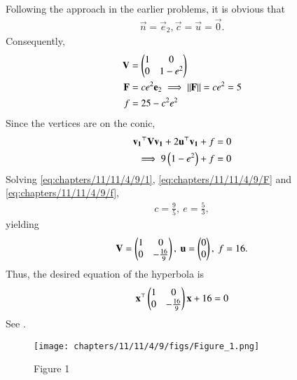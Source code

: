 Following the approach in the earlier problems, it is obvious that
	\begin{align}
		\vec{n} 
			= \vec{e}_2,
	\vec{c} =\vec{u}=\vec{0}.
\end{align}
Consequently,
%
\begin{align}
	\mathbf{V} &= \begin{pmatrix}1 &0\\ 0 & 1-e^2\end{pmatrix}
	\\
	\mathbf{F} &= ce^2\mathbf{e}_2 \implies \left\lVert\mathbf{F}\right\rVert = ce^2=5
\label{eq:chapters/11/11/4/9/F}
	\\
	f 
	  &= 25 - c^2 e^2
\label{eq:chapters/11/11/4/9/f}
\end{align}
%
Since the vertices are  on the conic,
\begin{align}
	\mathbf{v_1}^{\top}\mathbf{V}\mathbf{v_1} +2\mathbf{u}^{\top}\mathbf{v_1}+f &= 0\\
\implies 9\left(1-e^2\right) + f &= 0\\
 \label{eq:chapters/11/11/4/9/1}
\end{align}
Solving \eqref{eq:chapters/11/11/4/9/1},
\eqref{eq:chapters/11/11/4/9/F}
and
\eqref{eq:chapters/11/11/4/9/f},
\begin{align}
	c = \frac{9}{5},\ 
	e = \frac{5}{3},
\end{align}
%
yielding
\begin{align}
	\mathbf{V} = \begin{pmatrix}1&0\\0& -\frac{16}{9}\end{pmatrix} ,\
	\mathbf{u} = \begin{pmatrix}0\\0\end{pmatrix},\
	f = 16.
\end{align}
%
Thus, the desired equation of the hyperbola is
\begin{align}
	\mathbf{x}^{\top} \begin{pmatrix}1&0\\ 0 & -\frac{16}{9}\end{pmatrix} \mathbf{x} +16 =0
\end{align}
%
See
%
    .
\begin{figure}[H]
  \centering
    \texttt{[image: chapters/11/11/4/9/figs/Figure\_1.png]}
    \caption{Figure 1}
    \label{fig:chapters/11/11/4/9/}
\end{figure}
%



